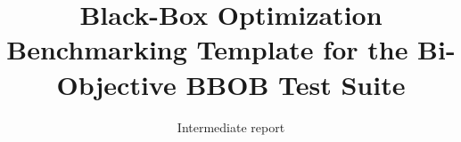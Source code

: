 \documentclass{sig-alternate}
\begin{document}
%

\title{Black-Box Optimization Benchmarking Template for the Bi-Objective BBOB Test Suite
}
\subtitle{Intermediate report
}

%
%
%
%
%
\end{document}
